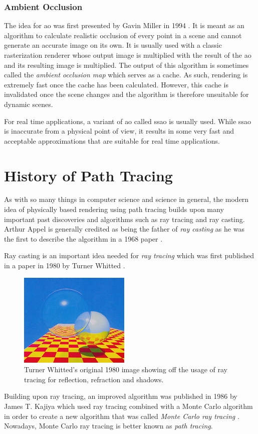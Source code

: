 \documentclass[
  twoside,
  11pt, a4paper,
  footinclude=true,
  headinclude=true,
  cleardoublepage=empty
]{scrreprt}
\begin{document}
\subsubsection{Ambient Occlusion}
The idea for \ac{ao} was first presented by Gavin Miller in 1994
\cite{inproceedings:ambient-occlusion}. It is meant as an algorithm to calculate realistic
occlusion of every point in a scene and cannot generate an accurate image on its own. It is
usually used with a classic rasterization renderer whose output image is multiplied with the result
of the \ac{ao} and its resulting image is multiplied. The output of this algorithm is sometimes
called the \emph{ambient occlusion map} which serves as a cache. As such, rendering is extremely
fast once the cache has been calculated. However, this cache is invalidated once the scene changes
and the algorithm is therefore unsuitable for dynamic scenes.

For real time applications, a variant of \ac{ao} called \acf{ssao} is usually used. While \ac{ssao}
is inaccurate from a physical point of view, it results in some very fast and acceptable
approximations that are suitable for real time applications.

\section{History of Path Tracing}
As with so many things in computer science and science in general, the modern idea of physically
based rendering using path tracing builds upon many important past discoveries and algorithms
such as ray tracing and ray casting.
Arthur Appel is generally credited as being the father of
\emph{ray casting} as he was the first to describe the algorithm in a 1968 paper
\cite{inproceedings:raycasting}.

Ray casting is an important idea needed for \emph{ray tracing} which was
first published in a paper in 1980 by Turner Whitted \cite{article:raytracing}.

\begin{figure}[H]
    \includegraphics{early-raytracing-whitted}
    \centering
    \caption{Turner Whitted's original 1980 \cite{article:raytracing} image showing off the usage of ray tracing for
    reflection, refraction and shadows.}
    \label{fig:early-raytracing-whitted}
\end{figure}
Building upon ray tracing, an improved algorithm was published in 1986 by James T. Kajiya which used ray tracing
combined with a Monte Carlo algorithm in order to create a new algorithm that was called \emph{Monte
Carlo ray tracing} \cite{inproceedings:pathtracing}. Nowadays, Monte Carlo ray tracing is better
known as \emph{path tracing}.
\end{document}
